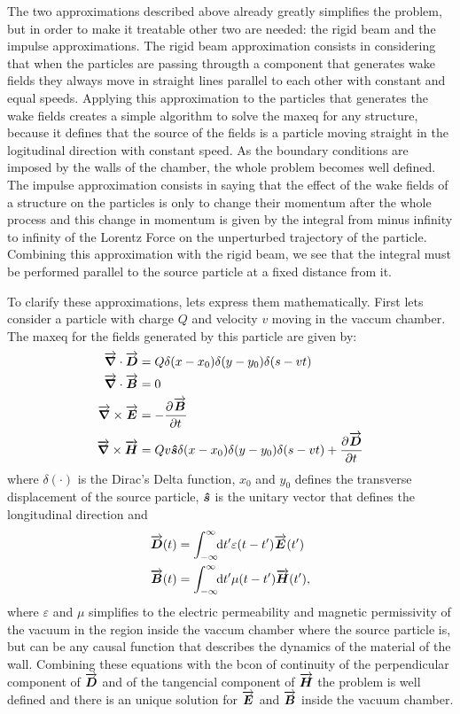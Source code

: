     The two approximations described above already greatly simplifies the problem, but in order to make it treatable other two are needed: the rigid beam and the impulse approximations. The rigid beam approximation consists in considering that when the particles are passing througth a component that generates wake fields they always move in straight lines parallel to each other with constant and equal speeds. Applying this approximation to the particles that generates the wake fields creates a simple algorithm to solve the \gls{maxeq} for any structure, because it defines that the source of the fields is a particle moving straight in the logitudinal direction with constant speed. As the boundary conditions are imposed by the walls of the chamber, the whole problem becomes well defined. The impulse approximation consists in saying that the effect of the wake fields of a structure on the particles is only to change their momentum after the whole process and this change in momentum is given by the integral from minus infinity to infinity of the Lorentz Force on the unperturbed trajectory of the particle. Combining this approximation with the rigid beam, we see that the integral must be performed parallel to the source particle at a fixed distance from it.

    To clarify these approximations, lets express them mathematically. First lets consider a particle with charge $Q$ and velocity $v$  moving in the vaccum chamber. The \gls{maxeq} for the fields generated by this particle are given by:
    \begin{align}\label{eq:maxeq}
	  	\nonumber
      	\overrightarrow{\boldsymbol{\nabla}}\cdot\overrightarrow{\boldsymbol{D}} &= Q\delta(x-x_0)\delta(y-y_0)\delta(s-vt)\\ \nonumber
	  	\overrightarrow{\boldsymbol{\nabla}}\cdot\overrightarrow{\boldsymbol{B}} &= 0\\
	  	\overrightarrow{\boldsymbol{\nabla}}\times\overrightarrow{\boldsymbol{E}} &= -\frac{\partial^{{}}\overrightarrow{\boldsymbol{B}}}{\partial t^{{}}}\\
	  	\nonumber
	  	\overrightarrow{\boldsymbol{\nabla}}\times\overrightarrow{\boldsymbol{H}} &= Qv\boldsymbol{\hat s}\delta(x-x_0)\delta(y-y_0)\delta(s-vt) + 		\frac{\partial^{{}}\overrightarrow{\boldsymbol{D}}}{\partial t^{{}}}
    \end{align}
    where $\delta(\cdot)$ is the Dirac's Delta function, $x_0$ and $y_0$ defines the transverse displacement of the source particle, $\boldsymbol{\hat s}$ is the unitary vector that defines the longitudinal direction and
    \begin{align}
  	  	\overrightarrow{\boldsymbol{D}}(t) &= \int_{-\infty}^{\infty}\!\!\text{d}t' \varepsilon(t-t')\overrightarrow{\boldsymbol{E}}(t')\\
	  	\overrightarrow{\boldsymbol{B}}(t) &= \int_{-\infty}^{\infty}\!\!\text{d}t' \mu(t-t')\overrightarrow{\boldsymbol{H}}(t'),
    \end{align}
    where $\varepsilon$ and $\mu$ simplifies to the electric permeability and magnetic permissivity of the vacuum in the region inside the vaccum chamber where the source particle is, but can be any causal function that describes the dynamics of the material of the wall. Combining these equations with the \gls{bcon} of continuity of the perpendicular component of $\overrightarrow{\boldsymbol{D}}$ and of the tangencial component of $\overrightarrow{\boldsymbol{H}}$ the problem is well defined and there is an unique solution for $\overrightarrow{\boldsymbol{E}}$ and $\overrightarrow{\boldsymbol{B}}$ inside the vacuum chamber.

